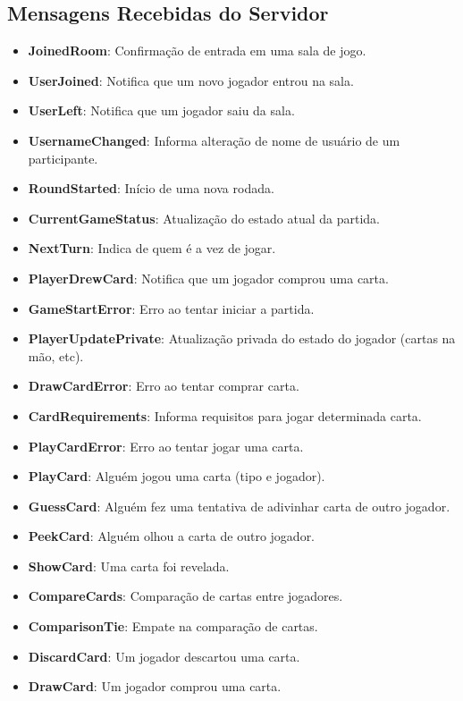 \subsection{Mensagens Recebidas do Servidor}
\begin{itemize}
    \item \textbf{JoinedRoom}: Confirmação de entrada em uma sala de jogo.
    \item \textbf{UserJoined}: Notifica que um novo jogador entrou na sala.
    \item \textbf{UserLeft}: Notifica que um jogador saiu da sala.
    \item \textbf{UsernameChanged}: Informa alteração de nome de usuário de um participante.
    \item \textbf{RoundStarted}: Início de uma nova rodada.
    \item \textbf{CurrentGameStatus}: Atualização do estado atual da partida.
    \item \textbf{NextTurn}: Indica de quem é a vez de jogar.
    \item \textbf{PlayerDrewCard}: Notifica que um jogador comprou uma carta.
    \item \textbf{GameStartError}: Erro ao tentar iniciar a partida.
    \item \textbf{PlayerUpdatePrivate}: Atualização privada do estado do jogador (cartas na mão, etc).
    \item \textbf{DrawCardError}: Erro ao tentar comprar carta.
    \item \textbf{CardRequirements}: Informa requisitos para jogar determinada carta.
    \item \textbf{PlayCardError}: Erro ao tentar jogar uma carta.
    \item \textbf{PlayCard}: Alguém jogou uma carta (tipo e jogador).
    \item \textbf{GuessCard}: Alguém fez uma tentativa de adivinhar carta de outro jogador.
    \item \textbf{PeekCard}: Alguém olhou a carta de outro jogador.
    \item \textbf{ShowCard}: Uma carta foi revelada.
    \item \textbf{CompareCards}: Comparação de cartas entre jogadores.
    \item \textbf{ComparisonTie}: Empate na comparação de cartas.
    \item \textbf{DiscardCard}: Um jogador descartou uma carta.
    \item \textbf{DrawCard}: Um jogador comprou uma carta.

\end{itemize}
